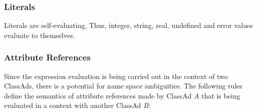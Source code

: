 \subsubsection{Literals}
Literals are self-evaluating, Thus, integer, string, real, undefined and
error values evaluate to themselves.

\subsubsection{Attribute References}
Since the expression evaluation is being carried out in the context of two
ClassAds, there is a potential for name space ambiguities.  
The following rules define the semantics of attribute references made 
by ClassAd $A$ that is being 
evaluated in a context with another ClassAd $B$:
